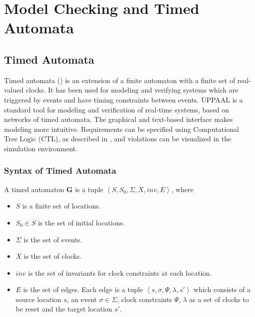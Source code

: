 %
%

\section{Model Checking and Timed Automata}
\subsection{Timed Automata}
Timed automata (\cite{timed_automata}) is an extension of a finite automaton with a finite set of real-valued clocks. It has been used for modeling and verifying systems which are triggered by events and have timing constraints between events.  UPPAAL is a standard tool for modeling and verification of real-time systems, based on networks of timed automata. The graphical and text-based interface makes modeling more intuitive. Requirements can be specified using Computational Tree Logic (CTL), as described in \cite{Clarke}, and violations can be visualized in the simulation environment.

\subsubsection{Syntax of Timed Automata}
A timed automaton \textbf{G} is a tuple $\left\langle S,S_0,\Sigma,X,inv,E\right\rangle$, where

\begin{itemize}
	\item $S$ is a finite set of locations.
	\item $S_0\in S$ is the set of initial locations.
	\item $\Sigma$ is the set of events.
	\item $X$ is the set of clocks.
	\item $inv$ is the set of invariants for clock constraints at each location.
	\item $E$ is the set of edges. Each edge is a tuple $\left\langle s,\sigma,\Psi,\lambda,s'\right\rangle$ which consists of a source location $s$, an event $\sigma\in\Sigma$, clock constraints $\Psi$, $\lambda$ as a set of clocks to be reset and the target location $s'$.   
\end{itemize}

